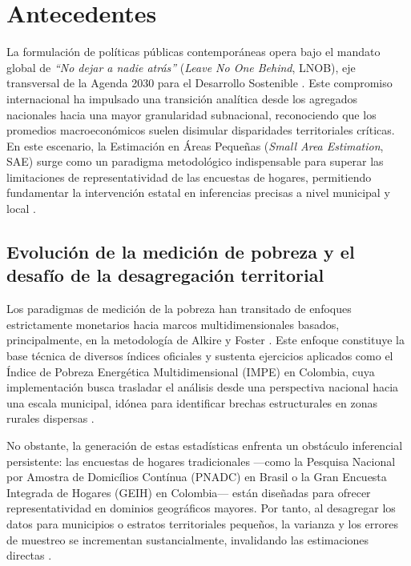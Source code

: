 \section{Antecedentes}
\label{sec:antecedentes}
La formulación de políticas públicas contemporáneas opera bajo el mandato global de \textit{``No dejar a nadie atrás''} (\textit{Leave No One Behind}, LNOB), eje transversal de la Agenda 2030 para el Desarrollo Sostenible \cite{cepal2024, un2030}. Este compromiso internacional ha impulsado una transición analítica desde los agregados nacionales hacia una mayor granularidad subnacional, reconociendo que los promedios macroeconómicos suelen disimular disparidades territoriales críticas. En este escenario, la Estimación en Áreas Pequeñas (\textit{Small Area Estimation}, SAE) surge como un paradigma metodológico indispensable para superar las limitaciones de representatividad de las encuestas de hogares, permitiendo fundamentar la intervención estatal en inferencias precisas a nivel municipal y local \cite{cepal2024, dane2024}.

\subsection{Evolución de la medición de pobreza y el desafío de la desagregación territorial}

Los paradigmas de medición de la pobreza han transitado de enfoques estrictamente monetarios hacia marcos multidimensionales basados, principalmente, en la metodología de Alkire y Foster \cite{alkire2011}. Este enfoque constituye la base técnica de diversos índices oficiales y sustenta ejercicios aplicados como el Índice de Pobreza Energética Multidimensional (IMPE) en Colombia, cuya implementación busca trasladar el análisis desde una perspectiva nacional hacia una escala municipal, idónea para identificar brechas estructurales en zonas rurales dispersas \cite{promigas2025}.

No obstante, la generación de estas estadísticas enfrenta un obstáculo inferencial persistente: las encuestas de hogares tradicionales ---como la Pesquisa Nacional por Amostra de Domicílios Contínua (PNADC) en Brasil o la Gran Encuesta Integrada de Hogares (GEIH) en Colombia--- están diseñadas para ofrecer representatividad en dominios geográficos mayores. Por tanto, al desagregar los datos para municipios o estratos territoriales pequeños, la varianza y los errores de muestreo se incrementan sustancialmente, invalidando las estimaciones directas \cite{moura2021, dane2024}.

